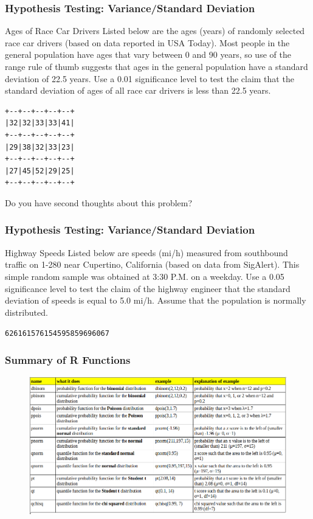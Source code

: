 \documentclass[xcolor=dvipsnames]{beamer}
\begin{document}
\begin{frame}[fragile]
  \frametitle{Hypothesis Testing:
    Variance/Standard Deviation}
{\ubung} Ages of Race Car Drivers Listed below are the ages (years) of
randomly selected race car drivers (based on data reported in USA
Today). Most people in the general population have ages that vary
between 0 and 90 years, so use of the range rule of thumb suggests
that ages in the general population have a standard deviation of
22.5 years. Use a 0.01 significance level to test the claim that
the standard deviation of ages of all race car drivers is less
than 22.5 years. 
\begin{verbatim}
+--+--+--+--+--+
|32|32|33|33|41|
+--+--+--+--+--+
|29|38|32|33|23|
+--+--+--+--+--+
|27|45|52|29|25|
+--+--+--+--+--+
\end{verbatim}
Do you have second thoughts about
this problem?
\end{frame}

\begin{frame}[fragile]
  \frametitle{Hypothesis Testing: Variance/Standard Deviation}
  {\ubung} Highway Speeds Listed below are speeds (mi/h) measured
  from southbound traffic on 1-280 near Cupertino, California
  (based on data from SigAlert). This simple random sample was
  obtained at 3:30 P.M. on a weekday. Use a 0.05 significance
  level to test the claim of the highway engineer that the
  standard deviation of speeds is equal to 5.0 mi/h. Assume that
  the population is normally distributed.
\begin{alltt}
62 61 61 57 61 54 59 58 59 69 60 67
\end{alltt}
\end{frame}

\begin{frame}
  \frametitle{Summary of R Functions}
    \begin{figure}[h]
    \includegraphics[scale=0.32]{./diagrams/rfunctions.png}
  \end{figure}
\end{frame}
\end{document}
